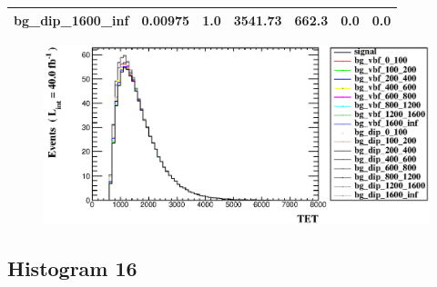 \documentclass[a4paper, 10pt]{article}
\begin{document}
\begin{table}[H]
\begin{center}
\begin{tabular}{|m{23.0mm}|m{23.0mm}|m{18.0mm}|m{19.0mm}|m{19.0mm}|m{19.0mm}|m{19.0mm}|}
      \hline
      {\cellcolor{white}         bg\_dip\_1600\_inf}& {\cellcolor{white}         0.00975}& {\cellcolor{white}         1.0}& {\cellcolor{white}         3541.73}& {\cellcolor{white}         662.3}& {\cellcolor{green}         0.0}& {\cellcolor{green}         0.0}\\
\hline
    \end{tabular}
  \end{center}
\end{table}

\begin{figure}[H]
  \begin{center}
    \includegraphics[scale=0.45]{selection_14.eps}\\
\caption{   }
  \end{center}
\end{figure}
      \newpage
\subsection{ Histogram 16}
\end{document}
